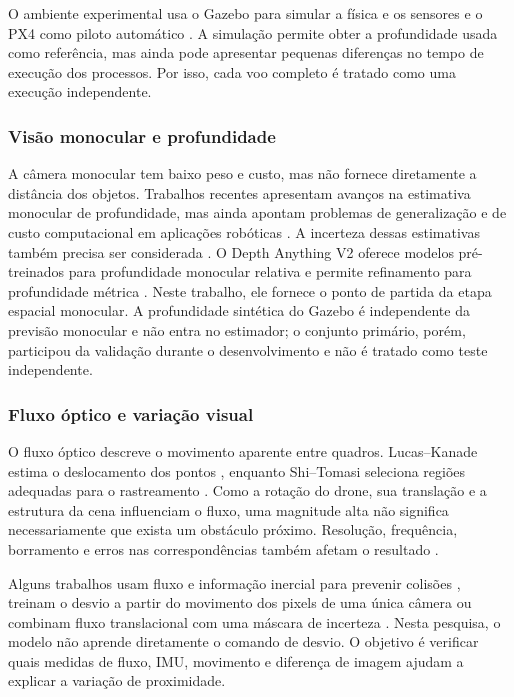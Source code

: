 \documentclass[article,a4paper,12pt,brazil,sumario=tradicional]{abntex2}
\begin{document}
O ambiente experimental usa o Gazebo para simular a física e os sensores \cite{Koenig7803} e o PX4 como piloto automático \cite{Meier8092}. A simulação permite obter a profundidade usada como referência, mas ainda pode apresentar pequenas diferenças no tempo de execução dos processos. Por isso, cada voo completo é tratado como uma execução independente.

\subsubsection{Visão monocular e profundidade}

A câmera monocular tem baixo peso e custo, mas não fornece diretamente a distância dos objetos. Trabalhos recentes apresentam avanços na estimativa monocular de profundidade, mas ainda apontam problemas de generalização e de custo computacional em aplicações robóticas \cite{Vyas2022,Arampatzakis2024,RealTimeMonocular2022}. A incerteza dessas estimativas também precisa ser considerada \cite{Liu2023}. O Depth Anything V2 oferece modelos pré-treinados para profundidade monocular relativa e permite refinamento para profundidade métrica \cite{DepthAnythingV2}. Neste trabalho, ele fornece o ponto de partida da etapa espacial monocular. A profundidade sintética do Gazebo é independente da previsão monocular e não entra no estimador; o conjunto primário, porém, participou da validação durante o desenvolvimento e não é tratado como teste independente.

\subsubsection{Fluxo óptico e variação visual}

O fluxo óptico descreve o movimento aparente entre quadros. Lucas--Kanade estima o deslocamento dos pontos \cite{LucasKanade1981}, enquanto Shi--Tomasi seleciona regiões adequadas para o rastreamento \cite{ShiTomasi1994}. Como a rotação do drone, sua translação e a estrutura da cena influenciam o fluxo, uma magnitude alta não significa necessariamente que exista um obstáculo próximo. Resolução, frequência, borramento e erros nas correspondências também afetam o resultado \cite{SimoneGodio2022,Peidong2021,Estimation2109}.

Alguns trabalhos usam fluxo e informação inercial para prevenir colisões \cite{Xiao2021}, treinam o desvio a partir do movimento dos pixels de uma única câmera \cite{PixelMotion2025} ou combinam fluxo translacional com uma máscara de incerteza \cite{Deng2026}. Nesta pesquisa, o modelo não aprende diretamente o comando de desvio. O objetivo é verificar quais medidas de fluxo, IMU, movimento e diferença de imagem ajudam a explicar a variação de proximidade.
\end{document}
